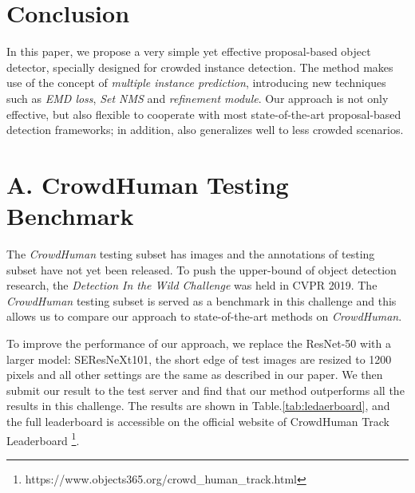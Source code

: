 \documentclass[10pt,twocolumn,letterpaper]{article}
\begin{document}
\section{Conclusion}
In this paper, we propose a very simple yet effective proposal-based object detector, specially designed for crowded instance detection. The method makes use of the concept of \emph{multiple instance prediction}, introducing new techniques such as \emph{EMD loss}, \emph{Set NMS} and \emph{refinement module}. Our approach is not only effective, but also flexible to cooperate with most state-of-the-art proposal-based detection frameworks; in addition, also generalizes well to less crowded scenarios. 

{\small


}

\newpage
\section*{A. CrowdHuman Testing Benchmark}
The \emph{CrowdHuman}\cite{shao2018crowdhuman} testing subset has  images and the 
annotations of testing subset have not yet been released.
To push the upper-bound of object detection research,
the \emph{Detection In the Wild Challenge} was held in CVPR 2019.
The \emph{CrowdHuman} testing subset is served as a benchmark in this challenge and 
this allows us to compare our approach to state-of-the-art 
methods on \emph{CrowdHuman}.

To improve the performance of our approach, we replace the 
ResNet-50\cite{he2016deep} with a larger model: SEResNeXt101\cite{hu2018squeeze,xie2017aggregated}, 
the short edge of test images are resized to 1200 pixels
and all other settings are the same as described in our paper. 
We then submit our result to the test server and find that our method outperforms 
all the results in this challenge.
The results are shown in Table.\ref{tab:ledaerboard}, and the full leaderboard 
is accessible on the official website of CrowdHuman Track Leaderboard
\footnote{https://www.objects365.org/crowd\_human\_track.html}.
\end{document}

